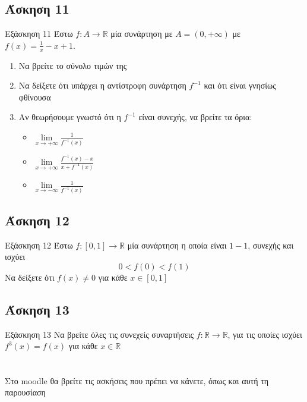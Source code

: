 \documentclass[greek]{beamer}
\begin{document}
\subsection{Άσκηση 11}
\begin{frame}{Εξάσκηση 11}
 Έστω $f:Α\to\mathbb{R}$ μία συνάρτηση με $Α=(0,+\infty)$ με $f(x)=\frac{1}{x}-x+1$.
 \begin{enumerate}
  \item<1-> Να βρείτε το σύνολο τιμών της
  \item<2-> Να δείξετε ότι υπάρχει η αντίστροφη συνάρτηση $f^{-1}$ και ότι είναι γνησίως φθίνουσα
  \item<3-> Αν θεωρήσουμε γνωστό ότι η $f^{-1}$ είναι συνεχής, να βρείτε τα όρια:
        \begin{itemize}
         \item $\lim\limits_{x \to +\infty}{ \frac{1}{f^{-1}(x)} }$
         \item<4-> $\lim\limits_{x \to +\infty}{ \frac{f^{-1}(x)-x}{x+f^{-1}(x)} }$
         \item<5-> $\lim\limits_{x \to -\infty}{ \frac{1}{f^{-1}(x)} }$
        \end{itemize}
 \end{enumerate}
\end{frame}

\subsection{Άσκηση 12}
\begin{frame}{Εξάσκηση 12}
 Έστω $f:[0,1]\to\mathbb{R}$ μία συνάρτηση η οποία είναι $1-1$, συνεχής και ισχύει
 $$0<f(0)<f(1)$$
 Να δείξετε ότι $f(x)\ne 0$ για κάθε $x\in [0,1]$
\end{frame}

\subsection{Άσκηση 13}
\begin{frame}{Εξάσκηση 13}
 Να βρείτε όλες τις συνεχείς συναρτήσεις $f:\mathbb{R}\to\mathbb{R}$, για τις οποίες ισχύει $f^3(x)=f(x)$ για κάθε $x\in\mathbb{R}$
\end{frame}

\section{}
\begin{frame}
 Στο moodle θα βρείτε τις ασκήσεις που πρέπει να κάνετε, όπως και αυτή τη παρουσίαση
\end{frame}
\end{document}
